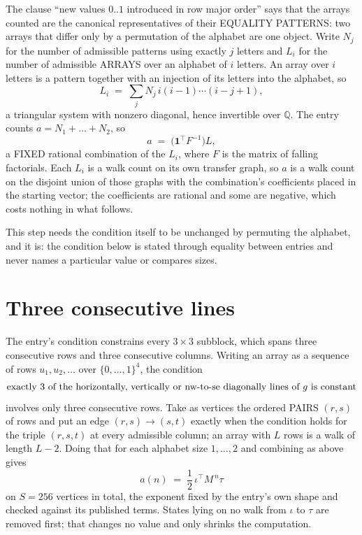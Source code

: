 \documentclass[11pt,a4paper]{article}
\theoremstyle{plain}
\theoremstyle{definition}
\begin{document}
The clause ``new values $0..1$ introduced in row major order'' says that the arrays
counted are the canonical representatives of their EQUALITY PATTERNS: two arrays that differ
only by a permutation of the alphabet are one object. Write $N_j$ for the number of admissible
patterns using exactly $j$ letters and $L_i$ for the number of admissible ARRAYS over an
alphabet of $i$ letters. An array over $i$ letters is a pattern together with an injection of
its letters into the alphabet, so
\[
L_i\;=\;\sum_{j}N_j\,i(i-1)\cdots(i-j+1),
\]
a triangular system with nonzero diagonal, hence invertible over $\mathbb{Q}$. The entry
counts $a=N_1+\dots+N_{2}$, so
\[
a\;=\;\bigl(\mathbf{1}^{\!\top}F^{-1}\bigr)L ,
\]
a FIXED rational combination of the $L_i$, where $F$ is the matrix of falling factorials.
Each $L_i$ is a walk count on its own transfer graph, so $a$ is a walk count on the disjoint
union of those graphs with the combination's coefficients placed in the starting vector; the
coefficients are rational and some are negative, which costs nothing in what follows.

This step needs the condition itself to be unchanged by permuting the alphabet, and it is:
the condition below is stated through equality between entries and never names a particular
value or compares sizes.

\section{Three consecutive lines}

The entry's condition constrains every $3\times3$ subblock, which spans three consecutive
rows and three consecutive columns. Writing an array as a sequence of rows
$u_1,u_2,\dots$ over $\{0,\dots,1\}^{4}$, the condition
\[
\text{exactly }3\text{ of the horizontally, vertically or nw-to-se diagonally lines of }g\text{ \text{is constant}}
\]
involves only three consecutive rows. Take as vertices the ordered PAIRS $(r,s)$ of
rows and put an edge $(r,s)\to(s,t)$ exactly when the condition holds for the triple
$(r,s,t)$ at every admissible column; an array with $L$ rows is a walk of length $L-2$.
Doing that for each alphabet size $1,\dots,2$ and combining as above gives
\[
a(n)\;=\;\frac{1}{2}\,\iota^{\!\top}M^{\,n}\tau
\]
on $S=256$ vertices in total, the exponent fixed by the entry's own shape and checked against
its published terms. States lying on no walk from $\iota$ to $\tau$ are removed first; that
changes no value and only shrinks the computation.
\end{document}
